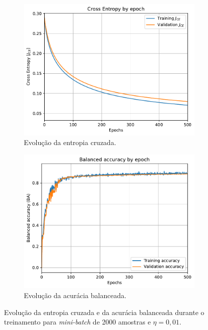 \begin{figure}[H]
	\begin{subfigure}[H]{0.49\textwidth}
		\centering
		\includegraphics[width = 0.98\linewidth]{../../plot/LR_1/CE_500_epochs_batch_size2000}
		\caption{Evolução da entropia cruzada.}
		\label{fig:CE_500_epochs_batch_size2000}
	\end{subfigure}
	\begin{subfigure}[H]{0.49\textwidth}
		\centering
		\includegraphics[width = 0.99\linewidth]{../../plot/LR_1/BA_500_epochs_batch_size2000}
		\caption{Evolução da acurácia balanceada.}
		\label{fig:BA_500_epochs_batch_size2000}
	\end{subfigure}
	\caption{Evolução da entropia cruzada e da acurácia balanceada durante o treinamento para \textit{mini-batch} de 2000 amostras e $\eta = 0,01$.}
\end{figure}

